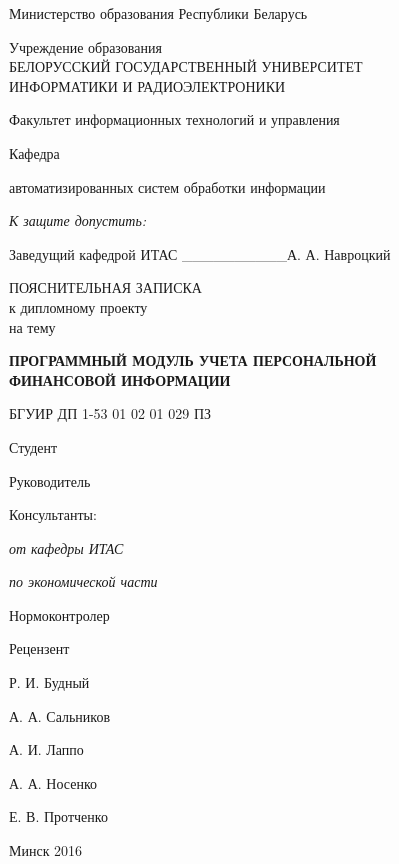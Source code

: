 \thispagestyle{empty}
\setlength{\parindent}{0ex} %

{\centering{}
  Министерство образования Республики Беларусь\par
}

\bigskip
{\centering{}
  Учреждение образования \\
  БЕЛОРУССКИЙ ГОСУДАРСТВЕННЫЙ УНИВЕРСИТЕТ \\
  ИНФОРМАТИКИ И РАДИОЭЛЕКТРОНИКИ\par
}

\bigskip
Факультет
информационных технологий и управления

\smallskip
\parbox{\widthof{Факультет}}{Кафедра}
автоматизированных систем обработки информации

\vspace{\baselineskip}
\hfill
\begin{minipage}{.4\textwidth}
  {\raggedright{}
    \textit{К защите допустить:}

    \smallskip
    Заведущий кафедрой ИТАС
    \_\_\_\_\_\_\_\_\_\_А. А. Навроцкий\par
  }
\end{minipage}

\vspace{2\baselineskip}

{\centering{}
  ПОЯСНИТЕЛЬНАЯ ЗАПИСКА \\
  к дипломному проекту \\
  на тему\par
}

\bigskip
{\centering{}
  \textbf{ПРОГРАММНЫЙ МОДУЛЬ УЧЕТА ПЕРСОНАЛЬНОЙ \\ ФИНАНСОВОЙ ИНФОРМАЦИИ}\par
}

\bigskip
{\centering{}
  БГУИР ДП 1-53 01 02 01 029 ПЗ\par
}

\vspace{\baselineskip}

\begin{minipage}{.6\textwidth}
Студент

Руководитель

Консультанты:

\hspace{0.3em} \textit{от кафедры ИТАС}

\hspace{0.3em} \textit{по экономической части}

Нормоконтролер

Рецензент
\end{minipage}
\hfill
\begin{minipage}{.3\textwidth}
  Р. И. Будный

  А. А. Сальников

  \vspace{\baselineskip}
  А. И. Лаппо

  А. А. Носенко

  Е. В. Протченко

  \vspace{0.8cm}
\end{minipage}

\vfill

{\centering{}
  Минск 2016\par
}

\setlength{\parindent}{1.25cm} %
